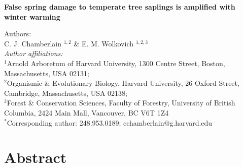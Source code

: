 \documentclass{article}\usepackage[]{graphicx}\usepackage[]{color}
\begin{document}
\noindent \textbf{\Large{False spring damage to temperate tree saplings is amplified with winter warming}}

\noindent Authors:\\
C. J. Chamberlain $^{1,2}$ \& E. M. Wolkovich $^{1,2,3}$
\vspace{2ex}\\
\emph{Author affiliations:}\\
$^{1}$Arnold Arboretum of Harvard University, 1300 Centre Street, Boston, Massachusetts, USA 02131; \\
$^{2}$Organismic \& Evolutionary Biology, Harvard University, 26 Oxford Street, Cambridge, Massachusetts, USA 02138; \\
$^{3}$Forest \& Conservation Sciences, Faculty of Forestry, University of British Columbia, 2424 Main Mall, Vancouver, BC V6T 1Z4\\
\vspace{2ex}
$^*$Corresponding author: 248.953.0189; cchamberlain@g.harvard.edu\\

\renewcommand{\thetable}{\arabic{table}}
\renewcommand{\thefigure}{\arabic{figure}}
\renewcommand{\labelitemi}{$-$}


\section*{Abstract} %
\end{document}
